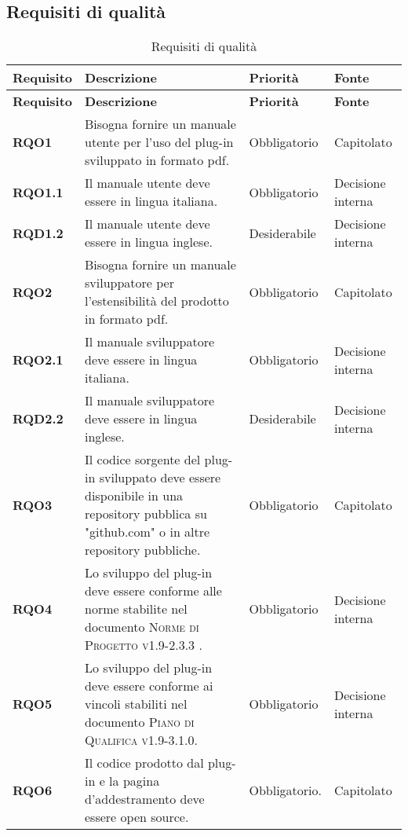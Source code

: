 \subsection{Requisiti di qualità}
\label{sub:requisiti_di_qualita}

\renewcommand{\arraystretch}{2} %
\begin{longtable}[H]{>{\centering\bfseries}m{2cm} >{\centering}m{9cm} >{\centering}m{2.5cm} >{\centering\arraybackslash}m{2.5cm}}
  \caption{Requisiti di qualità}%
  \label{tab:requisiti_di_qualità}                                                    \\
  \rowcolor{lightgray}
  {\textbf{Requisito}} & {\textbf{Descrizione}} & {\textbf{Priorità}} & {\textbf{Fonte}}  \\
  \endfirsthead%
  \rowcolor{lightgray}
  {\textbf{Requisito}} & {\textbf{Descrizione}} & {\textbf{Priorità}} & {\textbf{Fonte}}  \\
  \endhead%
  \rowcolor{white}
  \multicolumn{4}{c}{\textit{Continua alla pagina successiva}}
  \endfoot%
  \endlastfoot%
  \textbf{RQO1} & Bisogna fornire un manuale utente per l'uso del plug-in sviluppato in formato pdf. & Obbligatorio & Capitolato \\
  \textbf{RQO1.1} & Il manuale utente deve essere in lingua italiana. & Obbligatorio & Decisione interna \\
  \textbf{RQD1.2} & Il manuale utente deve essere in lingua inglese. & Desiderabile & Decisione interna \\
  \textbf{RQO2} & Bisogna fornire un manuale sviluppatore per l'estensibilità del prodotto in formato pdf. & Obbligatorio & Capitolato \\
  \textbf{RQO2.1} & Il manuale sviluppatore deve essere in lingua italiana. & Obbligatorio & Decisione interna \\
  \textbf{RQD2.2} & Il manuale sviluppatore deve essere in lingua inglese. & Desiderabile & Decisione interna \\
  \textbf{RQO3} & Il codice sorgente del plug-in sviluppato deve essere disponibile in una repository pubblica su "github.com" o in altre repository pubbliche. & Obbligatorio & Capitolato \\
  \textbf{RQO4} & Lo sviluppo del plug-in deve essere conforme alle norme stabilite nel documento \textsc{Norme di Progetto v1.9-2.3.3} . & Obbligatorio & Decisione interna \\
  \textbf{RQO5} & Lo sviluppo del plug-in deve essere conforme ai vincoli stabiliti nel documento \textsc{Piano di Qualifica v1.9-3.1.0}. & Obbligatorio & Decisione interna \\
  \textbf{RQO6} & Il codice prodotto dal plug-in e la pagina d'addestramento deve essere open source. & Obbligatorio. & Capitolato \\
\end{longtable}
